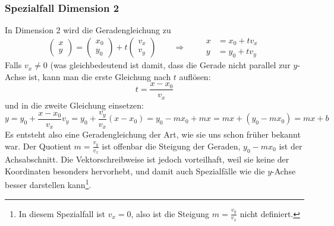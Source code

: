 \subsubsection{Spezialfall Dimension 2}
In Dimension 2 wird die Geradengleichung zu
\[
\begin{pmatrix}
x\\y
\end{pmatrix}
=
\begin{pmatrix}
x_0\\y_0
\end{pmatrix}
+t
\begin{pmatrix}
v_x\\v_y
\end{pmatrix}
\qquad
\Rightarrow
\qquad
\begin{aligned}
x&=x_0+tv_x\\
y&=y_0+tv_y
\end{aligned}
\]
Falls $v_x\ne 0$ (was gleichbedeutend ist damit, dass die Gerade
nicht parallel zur $y$-Achse ist, kann man die erste Gleichung nach
$t$ auflösen:
\[
t = \frac{x-x_0}{v_x}
\]
und in die zweite Gleichung einsetzen:
\[
y=y_0+
\frac{x-x_0}{v_x}v_y
=
y_0+\frac{v_y}{v_x}(x-x_0)
=
y_0-mx_0 +mx
=
mx+(y_0-mx_0)=mx+b
\]
Es entsteht also eine Geradengleichung der Art, wie sie uns schon früher
bekannt war.
Der Quotient $m=\frac{v_y}{v_x}$
ist offenbar die Steigung der Geraden, $y_0-mx_0$ ist der Achsabschnitt.
Die Vektorschreibweise ist jedoch vorteilhaft, weil sie keine der
Koordinaten besonders hervorhebt, und damit auch Spezialfälle wie
die $y$-Achse besser darstellen kann\footnote{In diesem Spezialfall ist
$v_x=0$, also ist die Steigung $m=\frac{v_y}{v_x}$ nicht definiert.}.

